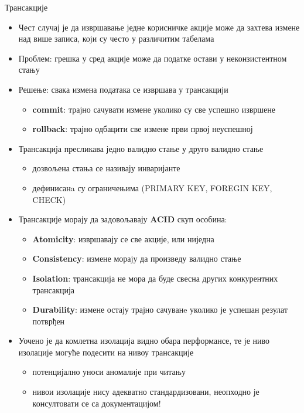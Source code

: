 \documentclass[aspectratio=169]{beamer}
\begin{document}
    \begin{frame}[allowframebreaks]{Трансакције}
        \begin{itemize}
            \item Чест случај је да извршавање једне корисничке акције може да захтева измене над више записа, који су често у различитим табелама
            \item Проблем: грешка у сред акције може да податке остави у неконзистентном стању
            \item Решење: свака измена података се извршава у трансакцији
            \begin{itemize}
                \item \textbf{commit}: трајно сачувати измене уколико су све успешно извршене
                \item \textbf{rollback}: трајно одбацити све измене први првој неуспешној 
            \end{itemize}
            \item Трансакција пресликава једно валидно стање у друго валидно стање
            \begin{itemize}
                \item дозвољена стања се називају инваријанте
                \item дефинисанa су ограничењима (PRIMARY KEY, FOREGIN KEY, CHECK)
            \end{itemize}
        \end{itemize}
        
        \framebreak
        
        \begin{itemize}
            \item Трансакције морају да задовољавају \textbf{ACID} скуп особина:
            \begin{itemize}
                \item \textbf{Atomicity}: извршавају се све акције, или ниједна
                \item \textbf{Consistency}: измене морају да произведу валидно стање
                \item \textbf{Isolation}: трансакција не мора да буде свесна других конкурентних трансакција
                \item \textbf{Durability}: измене остају трајно сачуванe уколико је успешан резулат потврђен
            \end{itemize}
            \item Уочено је да комлетна изолација видно обара перформансе, те је ниво изолације могуће подесити на нивоу трансакције
            \begin{itemize}
                \item потенцијално уноси аномалије при читању
                \item нивои изолације нису адекватно стандардизовани, неопходно је консултовати се са документацијом!
            \end{itemize}
        \end{itemize}
        

\end{frame}
\end{document}
